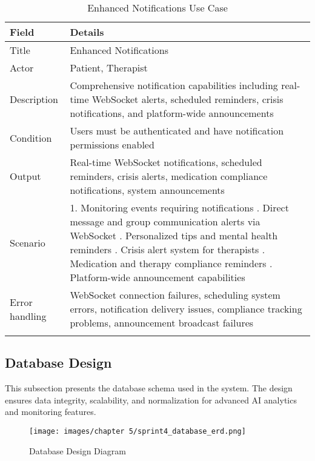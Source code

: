 \begin{longtable}{|p{3cm}|p{12cm}|}
\hline
\textbf{Field} & \textbf{Details} \\
\hline
Title & Enhanced Notifications \\
\hline
Actor & Patient, Therapist \\
\hline
Description & Comprehensive notification capabilities including real-time WebSocket alerts, scheduled reminders, crisis notifications, and platform-wide announcements \\
\hline
Condition & Users must be authenticated and have notification permissions enabled \\
\hline
Output & Real-time WebSocket notifications, scheduled reminders, crisis alerts, medication compliance notifications, system announcements \\
\hline
Scenario & 1. Monitoring events requiring notifications \newline 2. Direct message and group communication alerts via WebSocket \newline 3. Personalized tips and mental health reminders \newline 4. Crisis alert system for therapists \newline 5. Medication and therapy compliance reminders \newline 6. Platform-wide announcement capabilities \\
\hline
Error handling & WebSocket connection failures, scheduling system errors, notification delivery issues, compliance tracking problems, announcement broadcast failures \\
\hline
\caption{Enhanced Notifications Use Case}
\end{longtable}

\newpage

\subsection{Database Design}

This subsection presents the database schema used in the system. The design ensures data integrity, scalability, and normalization for advanced AI analytics and monitoring features.
 
\vfill
\begin{figure}[H]
    \centering
    \texttt{[image: images/chapter 5/sprint4\_database\_erd.png]}
    \caption{Database Design Diagram}
    \label{fig:database-design-sprint4}
\end{figure}

